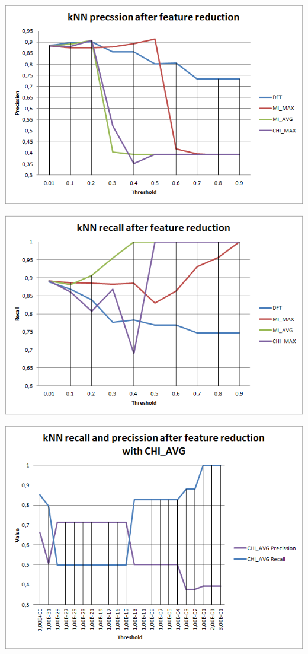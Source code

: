 \documentclass[12pt,a4paper]{report}
\begin{document}
\includegraphics[scale=1]{exp_precission_of_4}

\includegraphics[scale=1]{exp_recall_of_4}

\includegraphics[scale=1]{exp_of_chi_avg}
\end{document}
